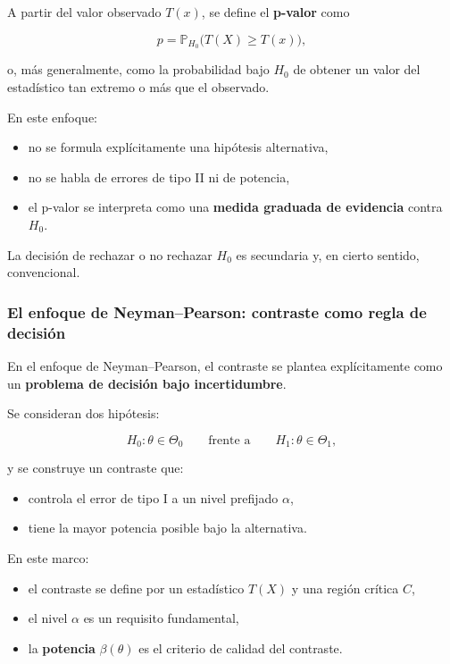 \documentclass[
]{article}
\providecommand{\tightlist}{%
  \setlength{\itemsep}{0pt}\setlength{\parskip}{0pt}}
\begin{document}
A partir del valor observado \(T(x)\), se define el \textbf{p-valor} como

\[
p=\mathbb{P}_{H_0}\bigl(T(X)\ge T(x)\bigr),
\]

o, más generalmente, como la probabilidad bajo \(H_0\) de obtener un valor del estadístico tan extremo o más que el observado.

En este enfoque:

\begin{itemize}
\tightlist
\item
  no se formula explícitamente una hipótesis alternativa,
\item
  no se habla de errores de tipo II ni de potencia,
\item
  el p-valor se interpreta como una \textbf{medida graduada de evidencia} contra \(H_0\).
\end{itemize}

La decisión de rechazar o no rechazar \(H_0\) es secundaria y, en cierto sentido, convencional.

\subsubsection{El enfoque de Neyman--Pearson: contraste como regla de decisión}\label{el-enfoque-de-neymanpearson-contraste-como-regla-de-decisiuxf3n}

En el enfoque de Neyman--Pearson, el contraste se plantea explícitamente como un \textbf{problema de decisión bajo incertidumbre}.

Se consideran dos hipótesis:

\[
H_0:\theta\in\Theta_0
\qquad \text{frente a} \qquad
H_1:\theta\in\Theta_1,
\]

y se construye un contraste que:

\begin{itemize}
\tightlist
\item
  controla el error de tipo I a un nivel prefijado \(\alpha\),
\item
  tiene la mayor potencia posible bajo la alternativa.
\end{itemize}

En este marco:

\begin{itemize}
\tightlist
\item
  el contraste se define por un estadístico \(T(X)\) y una región crítica \(C\),
\item
  el nivel \(\alpha\) es un requisito fundamental,
\item
  la \textbf{potencia} \(\beta(\theta)\) es el criterio de calidad del contraste.
\end{itemize}
\end{document}
